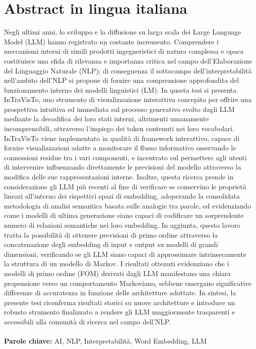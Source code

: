 \documentclass{Configuration_Files/PoliMi3i_thesis}
\begin{document}
\chapter*{Abstract in lingua italiana}
Negli ultimi anni, lo sviluppo e la diffusione su larga scala dei Large Language Model (LLM) hanno registrato un costante incremento.
Comprendere i meccanismi interni di simili prodotti ingegneristici di natura complessa e opaca costituisce una sfida di rilevanza e importanza critica nel campo dell'Elaborazione del Linguaggio Naturale (NLP); di conseguenza il sottocampo dell'interpretabilità nell'ambito dell'NLP si propone di fornire una comprensione approfondita del funzionamento interno dei modelli linguistici (LM).
In questa tesi si presenta InTraVisTo, uno strumento di visualizzazione interattiva concepito per offrire una prospettiva intuitiva ed immediata sul processo generativo svolto dagli LLM mediante la decodifica dei loro stati interni, altrimenti umanamente incomprensibili, attraverso l'impiego dei token contenuti nei loro vocabolari.
InTraVisTo viene implementato in qualità di framework interattivo, capace di fornire visualizzazioni adatte a monitorare il flusso informativo osservando le connessioni residue tra i vari componenti, e incentrato sul permettere agli utenti di intervenire influenzando direttamente le previsioni del modello attraverso la modifica delle sue rappresentazioni interne.
Inoltre, questa ricerca prende in considerazione gli LLM più recenti al fine di verificare se conservino le proprietà lineari all'interno dei rispettivi spazi di embedding, adoperando la consolidata metodologia di analisi semantica basata sulle analogie tra parole, ed evidenziando come i modelli di ultima generazione siano capaci di codificare un sorprendente numero di relazioni semantiche nei loro embedding.
In aggiunta, questo lavoro tratta la possibilità di ottenere previsioni di primo ordine attraverso la concatenazione degli embedding di input e output su modelli di grandi dimensioni, verificando se gli LLM siano capaci di approssimare intrinsecamente la struttura di un modello di Markov.
I risultati ottenuti evidenziano che i modelli di primo ordine (FOM) derivati dagli LLM manifestano una chiara propensione verso un comportamento Markoviano, sebbene emergano significative differenze di accuratezza in funzione delle architetture adottate.
In sintesi, la presente tesi riconferma risultati storici su nuove architetture e introduce un robusto strumento finalizzato a rendere gli LLM maggiormente trasparenti e accessibili alla comunità di ricerca nel campo dell'NLP\@.
\\
\\
\textbf{Parole chiave:} AI, NLP, Interpretabilità, Word Embedding, LLM
\end{document}
